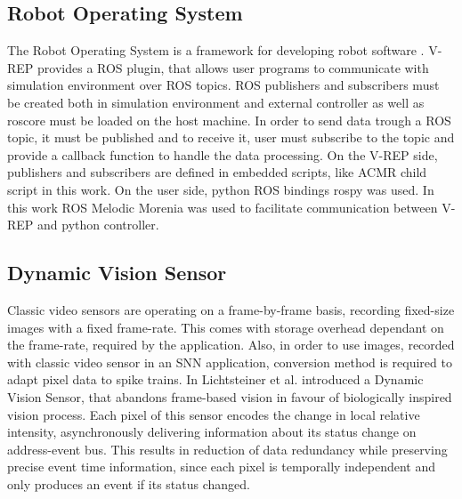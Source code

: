 \subsection{Robot Operating System}
The Robot Operating System is a framework for developing robot software \cite{2}. V-REP provides a ROS plugin, that allows user programs to communicate with simulation environment over ROS topics. ROS publishers and subscribers must be created both in simulation environment and external controller as well as roscore must be loaded on the host machine. In order to send data trough a ROS topic, it must be published and to receive it, user must subscribe to the topic and provide a callback function to handle the data processing. On the V-REP side, publishers and subscribers are defined in embedded scripts, like ACMR child script in this work. On the user side, python ROS bindings rospy was used. In this work ROS Melodic Morenia was used to facilitate communication between V-REP and python controller. 

\subsection{Dynamic Vision Sensor}\label{dvsSection}
Classic video sensors are operating on a frame-by-frame basis, recording fixed-size images with a fixed frame-rate. This comes with storage overhead dependant on the frame-rate, required by the application. Also, in order to use images, recorded with classic video sensor in an SNN application, conversion method is required to adapt pixel data to spike trains. In \cite{5} Lichtsteiner et al. introduced a Dynamic Vision Sensor, that abandons frame-based vision in favour of biologically inspired vision process. Each pixel of this sensor encodes the change in local relative intensity, asynchronously delivering information about its status change on address-event bus. This results in reduction of data redundancy while preserving precise event time information, since each pixel is temporally independent and only produces an event if its status changed. 

